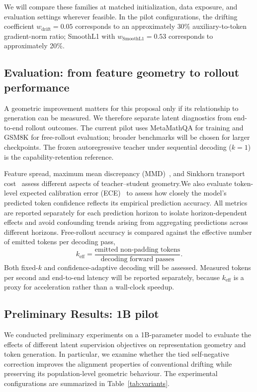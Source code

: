 \documentclass{article}
\begin{document}
We will compare these families at matched initialization, data exposure, and evaluation settings wherever feasible. In the pilot configurations, the drifting coefficient $w_{\mathrm{drift}}=0.05$ corresponds to an approximately 30\% auxiliary-to-token gradient-norm ratio; SmoothL1 with $w_{\mathrm{SmoothL1}}=0.53$ corresponds to approximately 20\%.

\subsection{Evaluation: from feature geometry to rollout performance}
\label{sec:evaluation}
A geometric improvement matters for this proposal only if its relationship to generation can be measured. We therefore separate latent diagnostics from end-to-end rollout outcomes. The current pilot uses MetaMathQA for training and GSM8K for free-rollout evaluation; broader benchmarks will be chosen for larger checkpoints. The frozen autoregressive teacher under sequential decoding ($k=1$) is the capability-retention reference.

Feature spread, maximum mean discrepancy (MMD)~\citep{gretton2012kernel}, and Sinkhorn transport cost~\citep{cuturi2013sinkhorn} assess different aspects of teacher--student geometry.We also evaluate token-level expected calibration error
(ECE)~\citep{joshi2025calibration} to assess how closely
the model's predicted token confidence reflects its
empirical prediction accuracy. All metrics are reported separately for each prediction
horizon to isolate horizon-dependent effects and avoid
confounding trends arising from aggregating predictions
across different horizons.
Free-rollout accuracy is compared against the effective number of emitted tokens per decoding pass,
\begin{equation}
 k_{\mathrm{eff}}=\frac{\text{emitted non-padding tokens}}
 {\text{decoding forward passes}}.
\end{equation}
Both fixed-$k$ and confidence-adaptive decoding will be assessed. Measured tokens per second and end-to-end latency will be reported separately, because $k_{\mathrm{eff}}$ is a proxy for acceleration rather than a wall-clock speedup. 

\subsection{Preliminary Results: 1B pilot}
\label{sec:current-progress}
We conducted preliminary experiments on a 1B-parameter model to evaluate the effects of different latent supervision objectives on representation geometry and token generation. 
In particular, we examine whether the tied self-negative correction improves
the alignment properties of conventional drifting while
preserving its population-level geometric behaviour.
The experimental
configurations are summarized in Table~\ref{tab:variants}.
\end{document}
